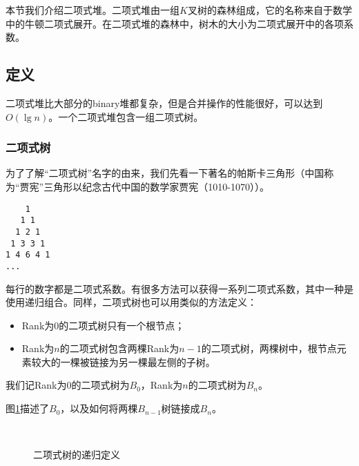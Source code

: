 \documentclass{ctexart}
\begin{document}
本节我们介绍二项式堆。二项式堆由一组$K$叉树的森林组成，它的名称来自于数学中的牛顿二项式展开。在二项式堆的森林中，树木的大小为二项式展开中的各项系数。

\subsection{定义}

二项式堆比大部分的binary堆都复杂，但是合并操作的性能很好，可以达到$O(\lg n)$。一个二项式堆包含一组二项式树。

\subsubsection{二项式树}
\label{Binomial tree} 

为了了解“二项式树”名字的由来，我们先看一下著名的帕斯卡三角形（中国称为“贾宪”三角形以纪念古代中国的数学家贾宪（1010-1070））\cite{wiki-pascal-triangle}。

\begin{verbatim}
    1
   1 1
  1 2 1
 1 3 3 1
1 4 6 4 1
...
\end{verbatim}

每行的数字都是二项式系数。有很多方法可以获得一系列二项式系数，其中一种是使用递归组合。同样，二项式树也可以用类似的方法定义：

\begin{itemize}
\item Rank为0的二项式树只有一个根节点；
\item Rank为$n$的二项式树包含两棵Rank为$n-1$的二项式树，两棵树中，根节点元素较大的一棵被链接为另一棵最左侧的子树。
\end{itemize}

我们记Rank为0的二项式树为$B_0$，Rank为$n$的二项式树为$B_n$。

图\ref{fig:link-bitree}描述了$B_0$，以及如何将两棵$B_{n-1}$树链接成$B_n$。

\begin{figure}[htbp]
  \centering
   \\
  \caption{二项式树的递归定义} \label{fig:link-bitree}
\end{figure}
\end{document}
